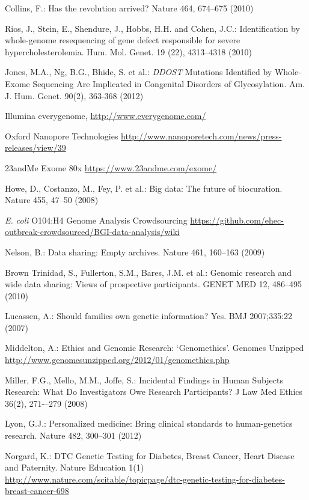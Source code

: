 \documentclass[runningheads,a4paper]{llncs}
\begin{document}
\begin{thebibliography}{4}

 Collins, F.: Has the revolution arrived? Nature 464, 674--675 (2010)

 Rios, J., Stein, E., Shendure, J., Hobbs, H.H. and Cohen, J.C.: Identification by whole-genome resequencing of gene defect responsible for severe hypercholesterolemia. Hum. Mol. Genet. 19 (22), 4313--4318 (2010)

 Jones, M.A., Ng, B.G., Bhide, S. et al.: \textit{DDOST} Mutations Identified by Whole-Exome Sequencing Are Implicated in Congenital Disorders of Glycosylation. Am. J. Hum. Genet. 90(2), 363-368 (2012)

 Illumina everygenome, \url{http://www.everygenome.com/}

 Oxford Nanopore Technologies \url{http://www.nanoporetech.com/news/press-releases/view/39}

 23andMe Exome 80x \url{https://www.23andme.com/exome/}

 Howe, D., Costanzo, M., Fey, P. et al.: Big data: The future of biocuration. Nature 455, 47--50 (2008)

 \emph{E. coli} O104:H4 Genome Analysis Crowdsourcing \url{https://github.com/ehec-outbreak-crowdsourced/BGI-data-analysis/wiki}

 Nelson, B.: Data sharing: Empty archives. Nature 461, 160--163 (2009)

 Brown Trinidad, S., Fullerton, S.M., Bares, J.M. et al.: Genomic research and wide data sharing: Views of prospective participants. GENET MED 12, 486–495 (2010)

 Lucassen, A.: Should families own genetic information? Yes. BMJ 2007;335:22 (2007) 

 Middelton, A.: Ethics and Genomic Research: ‘Genomethics’. Genomes Unzipped \url{http://www.genomesunzipped.org/2012/01/genomethics.php}

 Miller, F.G., Mello, M.M., Joffe, S.: Incidental Findings in Human Subjects Research: What Do Investigators Owe Research Participants? J Law Med Ethics 36(2), 271-–279 (2008)

 Lyon, G.J.: Personalized medicine: Bring clinical standards to human-genetics research. Nature 482, 300–301 (2012)

 Norgard, K.: DTC Genetic Testing for Diabetes, Breast Cancer, Heart Disease and Paternity. Nature Education 1(1) \url{http://www.nature.com/scitable/topicpage/dtc-genetic-testing-for-diabetes-breast-cancer-698}


\end{thebibliography}
\end{document}
